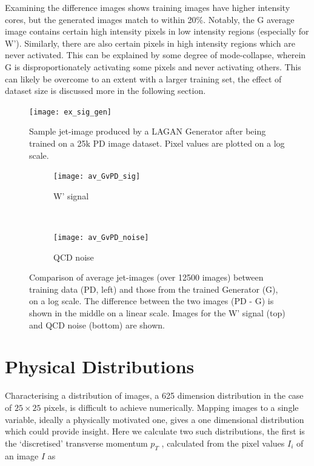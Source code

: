 \documentclass{report}
\begin{document}
Examining the difference images shows training images have higher intensity cores, but the generated images match to within 20\%. Notably, the G average image contains certain high intensity pixels in low intensity regions (especially for W'). Similarly, there are also certain pixels in high intensity regions which are never activated. This can be explained by some degree of mode-collapse, wherein G is disproportionately activating some pixels and never activating others. This can likely be overcome to an extent with a larger training set, the effect of dataset size is discussed more in the following section.  

\begin{figure}[H]
	\centering
	\texttt{[image: ex\_sig\_gen]}
	
	\caption{Sample jet-image produced by a LAGAN Generator after being trained on a 25k PD image dataset. Pixel values are plotted on a log scale.}
	\label{fig:ex_sig_gen}
	
\end{figure}

\begin{figure}[H]
	\centering
	\begin{subfigure}[t]{1.0\linewidth}
		\centering
		\texttt{[image: av\_GvPD\_sig]}
		\caption{W' signal}
	\end{subfigure}%
	\\
	\begin{subfigure}[t]{1.0\linewidth}
		\centering
		\texttt{[image: av\_GvPD\_noise]}
		\caption{QCD noise}
	\end{subfigure}
	
	\caption{Comparison of average jet-images (over \num{12500} images) between training data (PD, left) and those from the trained Generator (G), on a log scale. The difference between the two images (PD - G) is shown in the middle on a linear scale. Images for the W' signal (top) and QCD noise (bottom) are shown.}
	\label{fig:pdvg}
\end{figure}

\section{Physical Distributions}
\label{sec:physical}
Characterising a distribution of images, a 625 dimension distribution in the case of $25\times25$ pixels, is difficult to achieve numerically. Mapping images to a single variable, ideally a physically motivated one, gives a one dimensional distribution which could provide insight. Here we calculate two such distributions, the first is the `discretised' transverse momentum $p_T$ \cite{de2017learning}, calculated from the pixel values $I_i$ of an image $I$ as 
\end{document}
